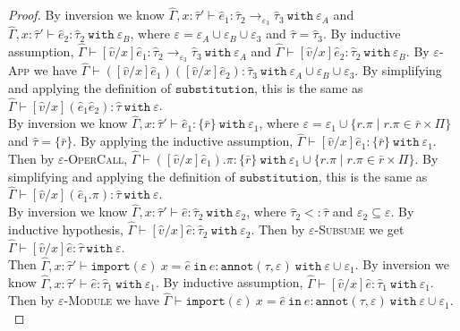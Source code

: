 \documentclass{llncs}
\newcommand{\keywadj}[1]{\mathtt{#1}}
\newcommand{\keyw}[1]{\keywadj{#1}~}
\newcommand{\kw}[1]{\keyw{ #1 }}
\newcommand{\kwa}[1]{\keywadj{ #1 }}
\newcommand{\module}[0]{
\kwa{import}(\varepsilon)~x = \hat e~\kwa{in}~e
}
\begin{document}
\begin{proof}
\noindent
{} By inversion we know $\hat \Gamma, x: \hat \tau' \vdash \hat e_1:\hat \tau_2 \rightarrow_{\varepsilon_3} \hat \tau_3~\kw{with} \varepsilon_A$ and $\hat \Gamma, x: \hat \tau' \vdash \hat e_2: \hat \tau_2~\kw{with} \varepsilon_B$, where $\varepsilon = \varepsilon_A \cup \varepsilon_B \cup \varepsilon_3$ and $\hat \tau = \hat \tau_3$. By inductive assumption, $\hat \Gamma \vdash [\hat v/x]\hat e_1: \hat \tau_2 \rightarrow_{\varepsilon_3} \hat \tau_3~\kw{with} \varepsilon_A$ and $\hat \Gamma \vdash [\hat v/x]\hat e_2: \hat \tau_2~\kw{with} \varepsilon_B$. By \textsc{$\varepsilon$-App} we have $\hat \Gamma \vdash ([\hat v/x]\hat e_1) ([\hat v/x]\hat e_2) : \hat \tau_3~\kw{with} \varepsilon_A \cup \varepsilon_B \cup \varepsilon_3$. By simplifying and applying the definition of $\kwa{substitution}$, this is the same as $\hat \Gamma \vdash [\hat v/x](\hat e_1 \hat e_2): \hat \tau~\kw{with} \varepsilon$. \\

\noindent
{} By inversion we know $\hat \Gamma, x: \hat \tau' \vdash \hat e_1: \{ \bar r \}~\kw{with} \varepsilon_1$, where $\varepsilon = \varepsilon_1 \cup \{ r.\pi \mid r.\pi \in \bar r \times \Pi \}$ and $\hat \tau = \{ \bar r \}$. By applying the inductive assumption, $\hat \Gamma \vdash [\hat v/x]\hat e_1 : \{ \bar r \} ~\kw{with} \varepsilon_1$. Then by \textsc{$\varepsilon$-OperCall}, $\hat \Gamma \vdash ([\hat v/x]\hat e_1).\pi: \{ \bar r \}~\kw{with} \varepsilon_1 \cup \{ r.\pi \mid r.\pi \in \bar r \times \Pi \}$. By simplifying and applying the definition of $\kwa{substitution}$, this is the same as $\hat \Gamma \vdash [\hat v/x](\hat e_1.\pi): \hat \tau~\kw{with} \varepsilon$.\\

\noindent
{} By inversion we know $\hat \Gamma, x: \hat \tau' \vdash \hat e: \hat \tau_2~\kw{with} \varepsilon_2$, where $\hat \tau_2 <: \hat \tau$ and $\varepsilon_2 \subseteq \varepsilon$. By inductive hypothesis, $\hat \Gamma \vdash [\hat v/x]\hat e: \hat \tau_2~\kw{with} \varepsilon_2$. Then by \textsc{$\varepsilon$-Subsume} we get $\hat \Gamma \vdash [\hat v/x]\hat e: \hat \tau~\kw{with} \varepsilon$. \\

\noindent
{} Then $\hat \Gamma, x: \hat \tau' \vdash \module : \kwa{annot}(\tau, \varepsilon)~\kw{with} \varepsilon \cup \varepsilon_1$. By inversion we know $\hat \Gamma, x: \hat \tau' \vdash \hat e: \hat \tau_1~\kw{with} \varepsilon_1$. By inductive assumption, $\hat \Gamma \vdash [\hat v/x]\hat e: \hat \tau_1~\kw{with} \varepsilon_1$. Then by \textsc{$\varepsilon$-Module} we have $\hat \Gamma \vdash \module: \kwa{annot}(\tau, \varepsilon)~\kw{with} \varepsilon \cup \varepsilon_1$.\\



\end{proof}
\end{document}
